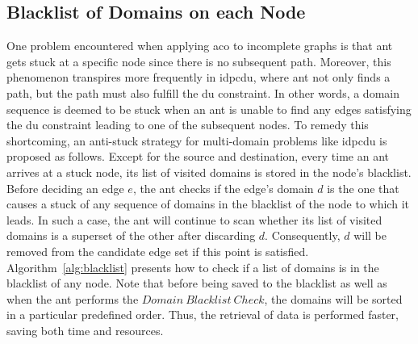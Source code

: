 \subsection{Blacklist of Domains on each Node}
One problem encountered when applying \gls{aco} to incomplete graphs is that ant gets stuck at a specific node since there is no subsequent path. Moreover, this phenomenon transpires more frequently in \gls{idpcdu}, where ant not only finds a path, but the path must also fulfill the \gls{du} constraint. In other words, a domain sequence is deemed to be stuck when an ant is unable to find any edges satisfying the \gls{du} constraint leading to one of the subsequent nodes. To remedy this shortcoming, an anti-stuck strategy for multi-domain problems like \gls{idpcdu} is proposed as follows. Except for the source and destination, every time an ant arrives at a stuck node, its list of visited domains is stored in the node's blacklist. Before deciding an edge $e$, the ant checks if the edge's domain $d$ is the one that causes a stuck of any sequence of domains in the blacklist of the node to which it leads. In such a case, the ant will continue to scan whether its list of visited domains is a superset of the other after discarding $d$. Consequently, $d$ will be removed from the candidate edge set if this point is satisfied. Algorithm~\ref{alg:blacklist} presents how to check if a list of domains is in the blacklist of any node. Note that before being saved to the blacklist as well as when the ant performs the $Domain~Blacklist~Check$, the domains will be sorted in a particular predefined order. Thus, the retrieval of data is performed faster, saving both time and resources.

